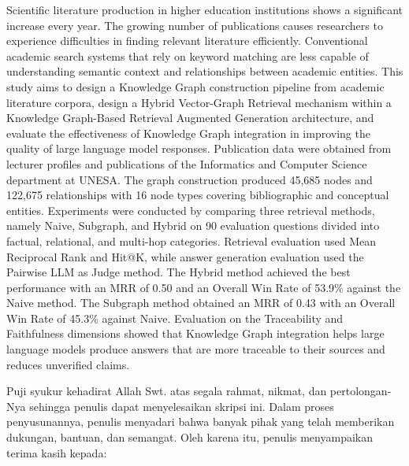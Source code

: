 \documentclass{SkripsiUnesa}
\begin{document}
\begin{Abstract}
    Scientific literature production in higher education institutions shows a significant increase every year. The growing number of publications causes researchers to experience difficulties in finding relevant literature efficiently. Conventional academic search systems that rely on keyword matching are less capable of understanding semantic context and relationships between academic entities. This study aims to design a Knowledge Graph construction pipeline from academic literature corpora, design a Hybrid Vector-Graph Retrieval mechanism within a Knowledge Graph-Based Retrieval Augmented Generation architecture, and evaluate the effectiveness of Knowledge Graph integration in improving the quality of large language model responses. Publication data were obtained from lecturer profiles and publications of the Informatics and Computer Science department at UNESA. The graph construction produced 45,685 nodes and 122,675 relationships with 16 node types covering bibliographic and conceptual entities. Experiments were conducted by comparing three retrieval methods, namely Naive, Subgraph, and Hybrid on 90 evaluation questions divided into factual, relational, and multi-hop categories. Retrieval evaluation used Mean Reciprocal Rank and Hit@K, while answer generation evaluation used the Pairwise LLM as Judge method. The Hybrid method achieved the best performance with an MRR of 0.50 and an Overall Win Rate of 53.9\% against the Naive method. The Subgraph method obtained an MRR of 0.43 with an Overall Win Rate of 45.3\% against Naive. Evaluation on the Traceability and Faithfulness dimensions showed that Knowledge Graph integration helps large language models produce answers that are more traceable to their sources and reduces unverified claims.

\end{Abstract}

\SuratOrisinalitas
\HalamanPersetujuan %
\HalamanPengesahan %

\Prakata

Puji syukur kehadirat Allah Swt. atas segala rahmat, nikmat, dan pertolongan-Nya sehingga penulis dapat menyelesaikan skripsi ini. Dalam proses penyusunannya, penulis menyadari bahwa banyak pihak yang telah memberikan dukungan, bantuan, dan semangat. Oleh karena itu, penulis menyampaikan terima kasih kepada:
\end{document}
